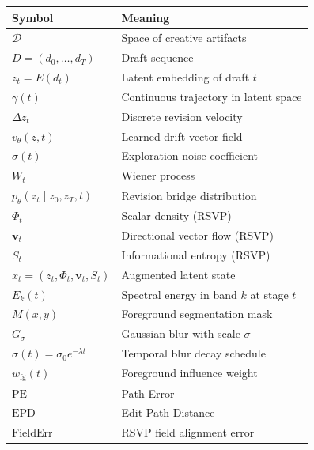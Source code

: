\documentclass[12pt,a4paper]{article}
\theoremstyle{draftthm}
\newcommand{\D}{\mathcal{D}}
\newcommand{\traj}{\gamma}
\newcommand{\enc}{E}
\newcommand{\vtheta}{v_{\theta}}
\newcommand{\ptheta}{p_{\theta}}
\newcommand{\dz}{\Delta z}
\newcommand{\bW}{W}
\begin{document}
\begin{center}
\begin{tabular}{ll}
\toprule
Symbol & Meaning \\
\midrule
$\D$ & Space of creative artifacts \\
$D = (d_0, \dots, d_T)$ & Draft sequence \\
$z_t = \enc(d_t)$ & Latent embedding of draft $t$ \\
$\traj(t)$ & Continuous trajectory in latent space \\
$\dz_t$ & Discrete revision velocity \\
$\vtheta(z,t)$ & Learned drift vector field \\
$\sigma(t)$ & Exploration noise coefficient \\
$\bW_t$ & Wiener process \\
$\ptheta(z_t \mid z_0, z_T, t)$ & Revision bridge distribution \\
$\Phi_t$ & Scalar density (RSVP) \\
$\mathbf{v}_t$ & Directional vector flow (RSVP) \\
$S_t$ & Informational entropy (RSVP) \\
$x_t = (z_t, \Phi_t, \mathbf{v}_t, S_t)$ & Augmented latent state \\
$E_k(t)$ & Spectral energy in band $k$ at stage $t$ \\
$M(x,y)$ & Foreground segmentation mask \\
$G_\sigma$ & Gaussian blur with scale $\sigma$ \\
$\sigma(t) = \sigma_0 e^{-\lambda t}$ & Temporal blur decay schedule \\
$w_{\mathrm{fg}}(t)$ & Foreground influence weight \\
$\mathrm{PE}$ & Path Error \\
$\mathrm{EPD}$ & Edit Path Distance \\
$\mathrm{FieldErr}$ & RSVP field alignment error \\
\bottomrule
\end{tabular}
\end{center}
\end{document}
